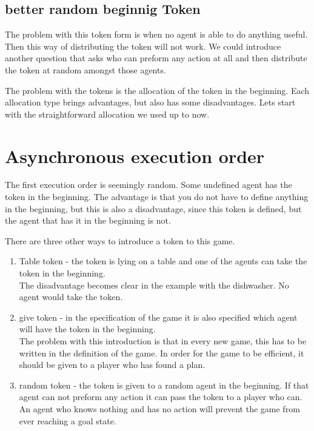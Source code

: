 \subsection{better random beginnig Token}
  The problem with this token form is when no agent is able to do anything useful. Then this way of distributing the token will not work. We could introduce another question that asks who can preform any action at all and then distribute the token at random amongst those agents.



  The problem with the tokens is the allocation of the token in the beginning. Each allocation type brings advantages, but also has some disadvantages. Lets start with the straightforward allocation we used up to now.


  \section{Asynchronous execution order}
    The first execution order is seemingly random. Some undefined agent has the token in the beginning. The advantage is that you do not have to define anything in the beginning, but this is also a disadvantage, since this token is defined, but the agent that has it in the beginning is not.




    There are three other ways to introduce a token to this game.
    \begin{enumerate}
      \item Table token - the token is lying on a table and one of the agents can take the token in the beginning. \\
      The disadvantage becomes clear in the example with the dishwasher. No agent would take the token.
      \item give token - in the specification of the game it is also specified which agent will have the token in the beginning. \\
      The problem with this introduction is that in every new game, this has to be written in the definition of the game. In order for the game to be efficient, it should be given to a player who has found a plan.
      \item random token - the token is given to a random agent in the beginning. If that agent can not preform any action it can pass the token to a player who can. \\
      An agent who knows nothing and has no action will prevent the game from ever reaching a goal state.
    \end{enumerate}

